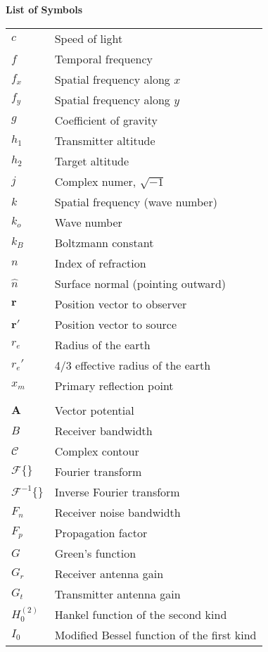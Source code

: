 \noindent\Large{\bf{List of Symbols}}

\vspace{24pt}

\small\normalsize
\begin{supertabular}{ll}
$c$ & Speed of light \\
$f$ & Temporal frequency \\
$f_x$ & Spatial frequency along $x$ \\
$f_y$ & Spatial frequency along $y$ \\
$g$ & Coefficient of gravity \\
$h_1$ & Transmitter altitude\\
$h_2$ & Target altitude \\
$j$ & Complex numer, $\sqrt{-1}$ \\
$k$ & Spatial frequency (wave number) \\
$k_o$ & Wave number \\
$k_B$ & Boltzmann constant \\
$n$ & Index of refraction \\
$\hat{n}$ & Surface normal (pointing outward) \\
$\mathbf{r}$ & Position vector to observer \\
$\mathbf{r}'$ & Position vector to source \\
$r_e$ & Radius of the earth \\
$r_e'$ & 4/3 effective radius of the earth \\
$x_m$ & Primary reflection point \\
\\
$\mathbf{A}$ & Vector potential \\
$B$ & Receiver bandwidth \\
$\mathcal{C}$ & Complex contour \\
$\mathcal{F}\{\}$ & Fourier transform \\
$\mathcal{F}^{-1}\{\}$ & Inverse Fourier transform \\
$F_n$ & Receiver noise bandwidth \\
$F_p$ & Propagation factor \\
$G$ & Green's function \\
$G_r$ & Receiver antenna gain \\
$G_t$ & Transmitter antenna gain \\
$H_0^{(2)}$ & Hankel function of the second kind \\
$I_0$ & Modified Bessel function of the first kind \\

\end{supertabular}
